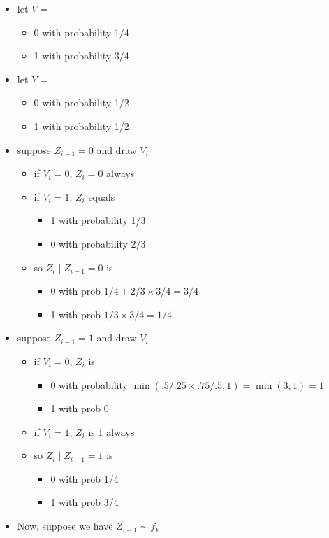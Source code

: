 \begin{itemize}
\item let $V =$
\begin{itemize}
\item 0 with probability 1/4
\item 1 with probability 3/4
\end{itemize}
\item let $Y =$
\begin{itemize}
\item 0 with probability 1/2
\item 1 with probability 1/2
\end{itemize}
\item suppose $Z_{i-1} = 0$ and draw $V_i$
\begin{itemize}
\item if $V_i = 0$, $Z_i = 0$ always
\item if $V_i = 1$, $Z_i$ equals
\begin{itemize}
\item 1 with probability 1/3
\item 0 with probability 2/3
\end{itemize}
\item so $Z_i \mid Z_{i-1} = 0$ is
\begin{itemize}
\item 0 with prob $1/4 + 2/3 \times 3/4 = 3/4$
\item 1 with prob $1/3 \times 3/4 = 1/4$
\end{itemize}
\end{itemize}
\item suppose $Z_{i-1} = 1$ and draw $V_i$
\begin{itemize}
\item if $V_i = 0$, $Z_i$ is
\begin{itemize}
\item 0 with probability $\min(.5/.25 \times .75/.5, 1) =
            \min(3,1) = 1$
\item 1 with prob 0
\end{itemize}
\item if $V_i = 1$, $Z_i$ is 1 always
\item so $Z_i \mid Z_{i-1} = 1$ is
\begin{itemize}
\item 0 with prob 1/4
\item 1 with prob 3/4
\end{itemize}
\end{itemize}
\item Now, suppose we have $Z_{i-1} \sim f_Y$

\end{itemize}

